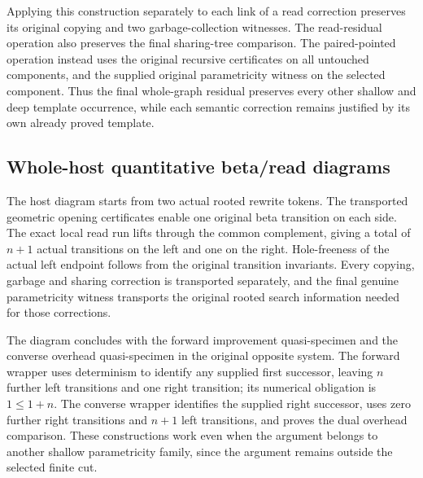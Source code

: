 Applying this construction separately to each link of a read correction preserves its original copying and two garbage-collection witnesses. The read-residual operation also preserves the final sharing-tree comparison. The paired-pointed operation instead uses the original recursive certificates on all untouched components, and the supplied original parametricity witness on the selected component. Thus the final whole-graph residual preserves every other shallow and deep template occurrence, while each semantic correction remains justified by its own already proved template.
\par{}
\par{}

\subsection{Whole-host quantitative beta/read diagrams}
The host diagram starts from two actual rooted rewrite tokens. The transported geometric opening certificates enable one original beta transition on each side. The exact local read run lifts through the common complement, giving a total of $n+1$ actual transitions on the left and one on the right. Hole-freeness of the actual left endpoint follows from the original transition invariants. Every copying, garbage and sharing correction is transported separately, and the final genuine parametricity witness transports the original rooted search information needed for those corrections.

The diagram concludes with the forward improvement quasi-specimen and the converse overhead quasi-specimen in the original opposite system. The forward wrapper uses determinism to identify any supplied first successor, leaving $n$ further left transitions and one right transition; its numerical obligation is $1\leq 1+n$. The converse wrapper identifies the supplied right successor, uses zero further right transitions and $n+1$ left transitions, and proves the dual overhead comparison. These constructions work even when the argument belongs to another shallow parametricity family, since the argument remains outside the selected finite cut.
\par{}

